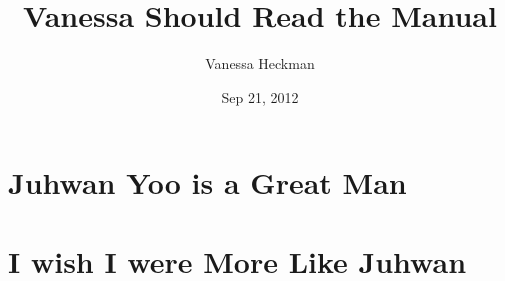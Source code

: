 \documentclass[12pt]{new_cit_thesis_modified}
\title{Vanessa Should Read the Manual}
\author{Vanessa Heckman}
\date{Sep 21, 2012}
\begin{document}
\maketitle
\begin{frontmatter}
\makecopyright
\makededication
\begin{acknowledgements}
\end{acknowledgements}
\begin{abstract}

\end{abstract}
\tableofcontents
\listoffigures
\listoftables
\end{frontmatter}
\chapter{Juhwan Yoo is a Great Man}\label{ch:1}

\chapter{I wish I were More Like Juhwan}\label{ch:2}

\appendix


{\label{sec:ref}

{
}
}
\end{document}
